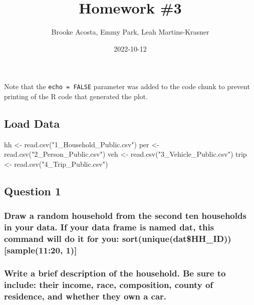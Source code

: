 \documentclass[
]{article}
\title{Homework \#3}
\author{Brooke Acosta, Emmy Park, Leah Martins-Krasner}
\date{2022-10-12}
\newenvironment{Shaded}{\begin{snugshade}}{\end{snugshade}}
\newcommand{\FunctionTok}[1]{\textcolor[rgb]{0.00,0.00,0.00}{#1}}
\newcommand{\NormalTok}[1]{#1}
\newcommand{\OtherTok}[1]{\textcolor[rgb]{0.56,0.35,0.01}{#1}}
\newcommand{\StringTok}[1]{\textcolor[rgb]{0.31,0.60,0.02}{#1}}
\begin{document}
\maketitle

Note that the \texttt{echo\ =\ FALSE} parameter was added to the code
chunk to prevent printing of the R code that generated the plot.

\hypertarget{load-data}{%
\subsection{Load Data}\label{load-data}}

\begin{Shaded}
\begin{Highlighting}[]
\NormalTok{hh }\OtherTok{\textless{}{-}} \FunctionTok{read.csv}\NormalTok{(}\StringTok{"1\_Household\_Public.csv"}\NormalTok{)}
\NormalTok{per }\OtherTok{\textless{}{-}} \FunctionTok{read.csv}\NormalTok{(}\StringTok{"2\_Person\_Public.csv"}\NormalTok{)}
\NormalTok{veh }\OtherTok{\textless{}{-}} \FunctionTok{read.csv}\NormalTok{(}\StringTok{"3\_Vehicle\_Public.csv"}\NormalTok{)}
\NormalTok{trip }\OtherTok{\textless{}{-}} \FunctionTok{read.csv}\NormalTok{(}\StringTok{"4\_Trip\_Public.csv"}\NormalTok{)}
\end{Highlighting}
\end{Shaded}

\hypertarget{question-1}{%
\subsection{Question 1}\label{question-1}}

\hypertarget{draw-a-random-household-from-the-second-ten-households-in-your-data.-if-your-data-frame-is-named-dat-this-command-will-do-it-for-you-sortuniquedathh_idsample1120-1}{%
\subsubsection{Draw a random household from the second ten households in
your data. If your data frame is named dat, this command will do it for
you: sort(unique(dat\$HH\_ID)){[}sample(11:20,
1){]}}\label{draw-a-random-household-from-the-second-ten-households-in-your-data.-if-your-data-frame-is-named-dat-this-command-will-do-it-for-you-sortuniquedathh_idsample1120-1}}

\hypertarget{write-a-brief-description-of-the-household.-be-sure-to-include-their-income-race-composition-county-of-residence-and-whether-they-own-a-car.}{%
\subsubsection{Write a brief description of the household. Be sure to
include: their income, race, composition, county of residence, and
whether they own a
car.}\label{write-a-brief-description-of-the-household.-be-sure-to-include-their-income-race-composition-county-of-residence-and-whether-they-own-a-car.}}
\end{document}
